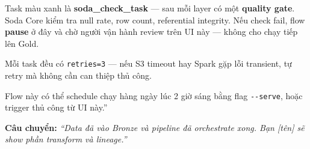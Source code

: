 \documentclass[12pt, a4paper]{article}
\newenvironment{speakerbox}[2]{%
  \begin{tcolorbox}[
    enhanced, breakable,
    colback=#1!6!white,
    colframe=#1,
    colbacktitle=#1,
    coltitle=white,
    fonttitle=\bfseries\large,
    title={#2},
    arc=4pt,
    boxrule=1.5pt,
    left=8pt, right=8pt, top=6pt, bottom=6pt,
  ]
}{%
  \end{tcolorbox}
}
\begin{document}
\begin{speakerbox}{p2color}{\faUser\ Người 2 · 3:00 -- 6:00}
\begin{scriptbox}
Task màu xanh là \textbf{soda\_check\_task} --- sau mỗi layer có một \textbf{quality gate}.
Soda Core kiểm tra null rate, row count, referential integrity. Nếu check fail, flow
\textbf{pause} ở đây và chờ người vận hành review trên UI này --- không cho chạy
tiếp lên Gold.

Mỗi task đều có \texttt{retries=3} --- nếu S3 timeout hay Spark gặp lỗi transient,
tự retry mà không cần can thiệp thủ công.

Flow này có thể schedule chạy hàng ngày lúc 2 giờ sáng bằng flag \texttt{-{}-serve},
hoặc trigger thủ công từ UI này.''
\end{scriptbox}

\textbf{Câu chuyển:} \textit{``Data đã vào Bronze và pipeline đã orchestrate xong.
Bạn [tên] sẽ show phần transform và lineage.''}

\end{speakerbox}

\vspace{1em}
\end{document}
